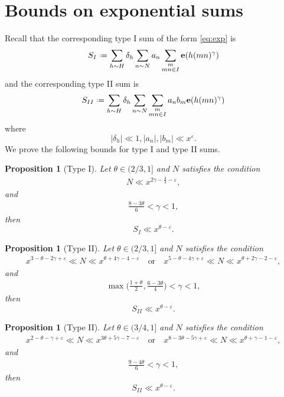 \documentclass[12pt, reqno, twoside, letterpaper]{amsart}
\numberwithin{equation}{section}
\def\eps{\varepsilon}
\newcommand{\e}{\ensuremath{\mathbf{e}}}
\theoremstyle{customthm}
\newtheorem{proposition}[X]{Proposition}
\theoremstyle{customrem}
\newcommand*{\defeq}{\mathrel{\vcenter{\baselineskip0.5ex \lineskiplimit0pt
			\hbox{\scriptsize.}\hbox{\scriptsize.}}}%
	=}
\begin{document}
	
\section{Bounds on exponential sums}\label{sec:Bounds on exponential sums}
Recall that the corresponding type I sum of the form \eqref{eq:exp} is 
\begin{equation}
\label{eq:tyI}
S_I \defeq \sum_{h \sim H} \delta_h  \sum_{n \sim N} a_n \sum_{ \substack{m \\ mn \in I}}  \e(h(mn)^\gamma)
\end{equation}	
and 
the corresponding type II sum is
\begin{equation}
\label{eq:tyII}
S_{II} \defeq \sum_{h \sim H} \delta_h \sum_{n \sim N}\sum_{ \substack{m \\ mn \in I}} a_n b_m \e(h(mn)^\gamma)
\end{equation}
where 
$$
|\delta_h| \ll 1, |a_n|, |b_m| \ll x^\eps. 
$$
We prove the following bounds for type I and type II sums. 

\begin{proposition}[Type I]\label{lem:type1}
Let $\theta \in (2/3,1]$ and $N$ satisfies the condition
\begin{align*}
N \ll x^{2\gamma -\frac{4}{3}-\varepsilon} ,
\end{align*}
and
\begin{align}\label{condition of type1}
\frac{8-3\theta}{6} < \gamma <1,
\end{align}
then
$$
S_I \ll x^{\theta-\varepsilon}.
$$
\end{proposition}

\begin{proposition}[Type II]\label{lem:type2_2}
	Let $\theta \in (2/3,1]$ and $N$ satisfies the condition
	\begin{align*}
		x^{3-\theta-2\gamma+\varepsilon} \ll N \ll x^{\theta + 4\gamma -4-\varepsilon} \quad \text{or} \quad x^{5-\theta-4\gamma +\varepsilon}\ll N \ll x^{\theta+2\gamma-2-\varepsilon},
	\end{align*}
	and
	\begin{align}\label{condition of type2_2}
		\max\Big(\frac{1+\theta}{2} , \frac{6-3\theta}{4}\Big) < \gamma <1,
	\end{align}
	then
	$$
	S_{II} \ll x^{\theta-\varepsilon}.
	$$
\end{proposition}

\begin{proposition}[Type II]\label{lem:type2_1}
	Let $\theta \in (3/4,1]$ and $N$ satisfies the condition
	\begin{align*}
		x^{2-\theta-\gamma +\varepsilon}\ll N \ll x^{3\theta+5\gamma-7-\varepsilon} \quad \text{or} \quad x^{8-3\theta-5\gamma+\varepsilon} \ll N \ll x^{\theta + \gamma -1-\varepsilon} ,
	\end{align*}
	and
	\begin{align}\label{condition of type2_1}
		\frac{9-4\theta}{6} < \gamma <1,
	\end{align}
	then
	$$
	S_{II} \ll x^{\theta-\varepsilon}.
	$$
\end{proposition}
\end{document}
